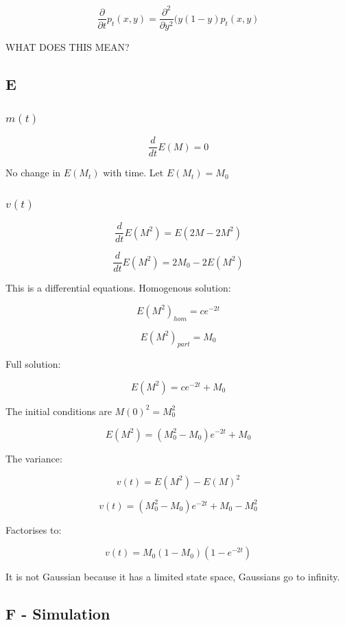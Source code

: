 \documentclass{article}
\begin{document}
$$\frac{\partial}{\partial t}p_t(x,y) = \frac{\partial^2}{\partial y^2} (y(1-y) p_t(x,y)$$

WHAT DOES THIS MEAN?

\subsection{E}

\subsubsection{$m(t)$}

$$\frac{d}{dt}E(M) = 0$$

No change in $E(M_t)$ with time. Let $E(M_t) = M_0$

\subsubsection{$v(t)$}

$$\frac{d}{dt}E(M^2) = E(2M - 2M^2)$$

$$\frac{d}{dt}E(M^2) = 2M_0 - 2E(M^2)$$

This is a differential equations. Homogenous solution:

$$E(M^2)_{hom} = c e^{-2t}$$

$$E(M^2)_{part} = M_0$$

Full solution:

$$E(M^2) = c e^{-2t} + M_0$$

The initial conditions are $M(0)^2 = M_0^2$ 

$$E(M^2) = (M_0^2 -M_0)e^{-2t} + M_0$$

The variance:

$$v(t) = E(M^2) - E(M)^2$$

$$v(t) = (M_0^2 -M_0)e^{-2t} + M_0 - M_0^2$$

Factorises to:

$$v(t) = M_0(1-M_0)(1-e^{-2t})$$

It is not Gaussian because it has a limited state space, Gaussians go to infinity.

\subsection{F - Simulation}
\end{document}
